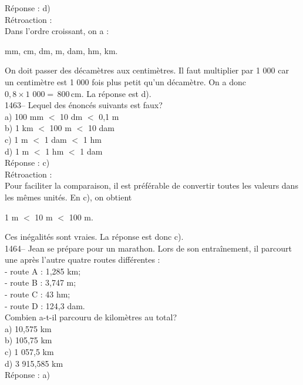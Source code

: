 R\'eponse : d)\\

R\'etroaction :\\
Dans l'ordre croissant, on a : \vskip 10pt
\begin{center}
mm,           cm,            dm,           m,           dam, hm,
  km.
\end{center}
\vskip 10pt On doit passer des d\'ecam\`etres aux centim\`etres. Il
faut multiplier par {\textrm{1 000 }}car un centim\`etre est
{\textrm{1 000}} fois plus petit qu'un d\'ecam\`etre. On a donc
$0,8\times{\textrm{1 000}}=\,800\,$cm. La r\'eponse est d).\\

1463-- Lequel des \'enonc\'es suivants est faux?\\
a) 100 mm $<$ 10 dm $<$ 0,1 m\\
b) 1 km $<$ 100 m $<$ 10 dam\\
c) 1 m $<$ 1 dam $<$ 1 hm\\
d) 1 m $<$ 1 hm $<$ 1 dam\\

R\'eponse : c)\\

R\'etroaction :\\
Pour faciliter la comparaison, il est pr\'ef\'erable de convertir
toutes les valeurs dans les m\^emes unit\'es. En c), on obtient
\begin{center}
1 m $<$ 10 m $<$ 100 m.
\end{center}
Ces in\'egalit\'es sont vraies. La r\'eponse est donc c). \\

1464-- Jean se pr\'epare pour un marathon. Lors de son entra\^inement,
il parcourt une apr\`es l'autre quatre routes diff\'erentes :\\

- route A : 1,285 km;\\
- route B : 3,747 m;\\
- route C : 43 hm;\\
- route D : 124,3 dam. \\

Combien a-t-il parcouru de kilom\`etres au total?\\
a) 10,575 km\\
b) 105,75 km\\
c) 1 057,5 km\\
d) 3 915,585 km\\

R\'eponse : a)\\

